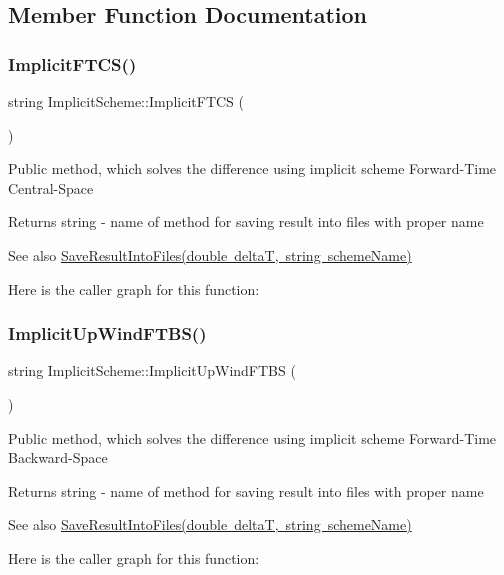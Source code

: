 \subsection{Member Function Documentation}
\mbox{\label{class_implicit_scheme_afd2b8e73e914a04c326b8cba0d5810ce}} 
\subsubsection{\texorpdfstring{Implicit\+F\+T\+C\+S()}{ImplicitFTCS()}}
{\footnotesize\ttfamily string Implicit\+Scheme\+::\+Implicit\+F\+T\+CS (\begin{DoxyParamCaption}{ }\end{DoxyParamCaption})}

Public method, which solves the difference using implicit scheme Forward-\/\+Time Central-\/\+Space \begin{DoxyReturn}{Returns}
string -\/ name of method for saving result into files with proper name 
\end{DoxyReturn}
\begin{DoxySeeAlso}{See also}
\mbox{\hyperlink{class_scheme_ae4512b4c8ead4d8ced95174f0b241f8a}{Save\+Result\+Into\+Files(double delta\+T, string scheme\+Name)}} 
\end{DoxySeeAlso}
Here is the caller graph for this function\+:
\mbox{\label{class_implicit_scheme_ab8311a005d69690622e0ddaa0dcff94d}} 
\subsubsection{\texorpdfstring{Implicit\+Up\+Wind\+F\+T\+B\+S()}{ImplicitUpWindFTBS()}}
{\footnotesize\ttfamily string Implicit\+Scheme\+::\+Implicit\+Up\+Wind\+F\+T\+BS (\begin{DoxyParamCaption}{ }\end{DoxyParamCaption})}

Public method, which solves the difference using implicit scheme Forward-\/\+Time Backward-\/\+Space \begin{DoxyReturn}{Returns}
string -\/ name of method for saving result into files with proper name 
\end{DoxyReturn}
\begin{DoxySeeAlso}{See also}
\mbox{\hyperlink{class_scheme_ae4512b4c8ead4d8ced95174f0b241f8a}{Save\+Result\+Into\+Files(double delta\+T, string scheme\+Name)}} 
\end{DoxySeeAlso}
Here is the caller graph for this function\+:
\mbox{\label{class_implicit_scheme_a2f0cee270b60bc42f8f5e864255f5e29}} 
